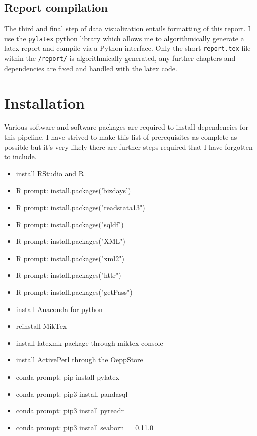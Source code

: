 \subsection{Report compilation}
The third and final step of data visualization entails formatting of this report. I use the \verb|pylatex| python library which allows me to algorithmically generate a latex report and compile via a Python interface. Only the short \verb|report.tex| file within the \verb|/report/| is algorithmically generated, any further chapters and dependencies are fixed and handled with the latex code.


\section{Installation}
Various software and software packages are required to install dependencies for this pipeline. I have strived to make this list of prerequisites as complete as possible but it's very likely there are further steps required that I have forgotten to include.
\begin{itemize}
	\item install RStudio and R
	\item R prompt: install.packages('bizdays')
	\item R prompt: install.packages("readstata13")	
	\item R prompt: install.packages("sqldf")
	\item R prompt: install.packages("XML")
	\item R prompt: install.packages("xml2")	
	\item R prompt: install.packages("httr")
	\item R prompt: install.packages("getPass")
	\item install Anaconda for python
	\item reinstall MikTex
	\item install latexmk package through miktex console
	\item install ActivePerl through the OeppStore
	\item conda prompt: pip install pylatex
	\item conda prompt: pip3 install pandasql
	\item conda prompt: pip3 install pyreadr
	\item conda prompt: pip3 install seaborn==0.11.0
\end{itemize}
